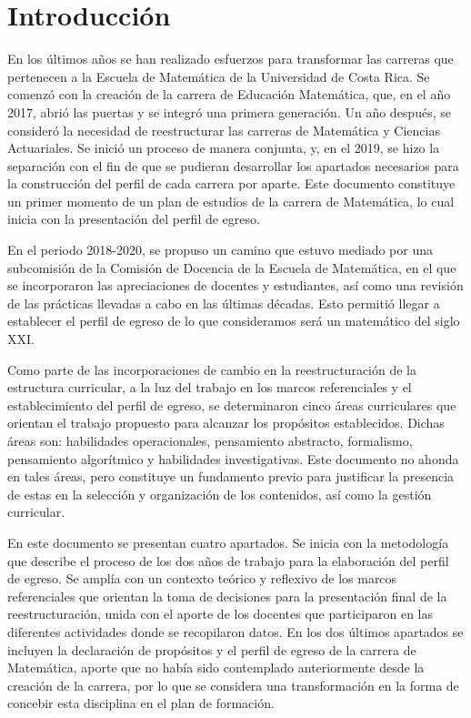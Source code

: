 ﻿\chapter{Introducción}

En los últimos años se han realizado esfuerzos para transformar las carreras que pertenecen a la Escuela de Matemática de la Universidad de Costa Rica. Se comenzó con la creación de la carrera de Educación Matemática, que, en el año 2017, abrió las puertas y se integró una primera generación. Un año después, se consideró la necesidad de reestructurar las carreras de Matemática y Ciencias Actuariales. Se inició un proceso de manera conjunta, y, en el 2019, se hizo la separación con el fin de que se pudieran desarrollar los apartados necesarios para la construcción del perfil de cada carrera por aparte. Este documento constituye un primer momento de un plan de estudios de la carrera de Matemática, lo cual inicia con la presentación del perfil de egreso.

En el periodo 2018-2020, se propuso un camino que estuvo mediado por una subcomisión de la Comisión de Docencia de la Escuela de Matemática, en el que se incorporaron las apreciaciones de docentes y estudiantes, así como una revisión de las prácticas llevadas a cabo en las últimas décadas. Esto permitió llegar a establecer el perfil de egreso de lo que consideramos será un matemático del siglo XXI.

Como parte de las incorporaciones de cambio en la reestructuración de la estructura curricular, a la luz del trabajo en los marcos referenciales y el establecimiento del perfil de egreso, se determinaron cinco áreas curriculares que orientan el trabajo propuesto para alcanzar los propósitos establecidos. Dichas áreas son: habilidades operacionales, pensamiento abstracto, formalismo, pensamiento algorítmico y habilidades investigativas. Este documento no ahonda en tales áreas, pero constituye un fundamento previo para justificar la presencia de estas en la selección y organización de los contenidos, así como la gestión curricular. 

En este documento se presentan cuatro apartados. Se inicia con la metodología que describe el proceso de los dos años de trabajo para la elaboración del perfil de egreso. Se amplía con un contexto teórico y reflexivo de los marcos referenciales que orientan la toma de decisiones para la presentación final de la reestructuración, unida con el aporte de los docentes que participaron en las diferentes actividades donde se recopilaron datos. En los dos últimos apartados se incluyen la declaración de propósitos y el perfil de egreso de la carrera de Matemática, aporte que no había sido contemplado anteriormente desde la creación de la carrera, por lo que se considera una transformación en la forma de concebir esta disciplina en el plan de formación. 

